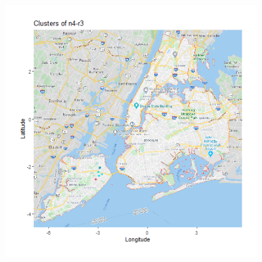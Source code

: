 \documentclass{FR16}
\begin{document}
\begin{figure}[!htb]
\begin{minipage}{0.33\textwidth}
   \end{minipage}
   \begin{minipage}{0.33\textwidth}
     \centering
     \includegraphics[width=1\linewidth]{figures/clust-n4-r3.png} 
   \end{minipage}\hfill
 


\end{figure}
\end{document}
